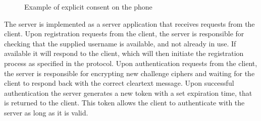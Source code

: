 \begin{figure}[bth]
        \myfloatalign
         \quad
        \caption{Example of explicit consent on the phone}
        \label{fig:phone}
\end{figure}

The \gls{server} is implemented as a server application that receives requests from the \gls{client}. Upon registration requests from the \gls{client}, the server is responsible for checking that the supplied username is available, and not already in use. If available it will respond to the \gls{client}, which will then initiate the registration process as specified in the protocol. Upon authentication requests from the \gls{client}, the server is responsible for encrypting new challenge ciphers and waiting for the \gls{client} to respond back with the correct cleartext message. Upon successful authentication the server generates a new token with a set expiration time, that is returned to the \gls{client}. This token allows the \gls{client} to authenticate with the \gls{server} as long as it is valid.

